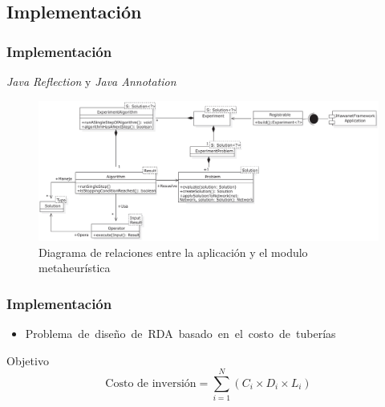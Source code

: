 \documentclass[9pt]{beamer}
\begin{document}



    \subsection{Implementación}

    \begin{frame}
        \frametitle{Implementación}                       
        \textit{Java Reflection} y \textit{Java Annotation}
        \begin{figure}
            \includegraphics[width=\textwidth]{assets/InterfazHumano-app.eps}
            \caption{Diagrama de relaciones entre la aplicación y el modulo metaheurística}
        \end{figure}

    \end{frame}

    \begin{frame}
        \frametitle{Implementación}                       
        \begin{itemize}
            \item Problema de diseño de RDA basado en el costo de tuberías
        \end{itemize} 

        \begin{block}{Objetivo}
            \begin{equation*}
                \text{Costo de inversión} = \sum_{i=1}^{N} (C_i \times D_i \times L_i)
            \end{equation*}
        \end{block}
        
    \end{frame}
\end{document}
